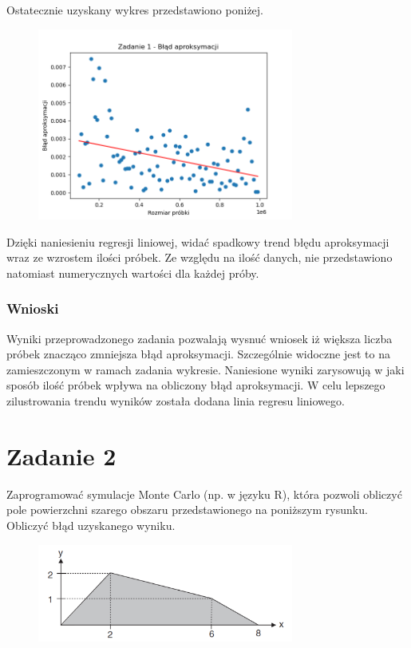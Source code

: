 \documentclass[12pt,oneside,a4paper]{book} %
\theoremstyle{break}
\begin{document}
Ostatecznie uzyskany wykres przedstawiono poniżej.
\begin{figure}[H]
  \centering
  \includegraphics[width=0.75\textwidth]{pi_aproximation_based_on_sample_size.png}
\end{figure}
Dzięki naniesieniu regresji liniowej, widać spadkowy trend błędu aproksymacji wraz ze wzrostem ilości próbek. Ze względu na ilość danych, nie przedstawiono natomiast numerycznych wartości dla każdej próby.

\subsection*{Wnioski}

Wyniki przeprowadzonego zadania pozwalają wysnuć wniosek iż większa liczba próbek znacząco zmniejsza błąd aproksymacji. Szczególnie widoczne jest to na zamieszczonym w ramach zadania wykresie. Naniesione wyniki zarysowują w jaki sposób ilość próbek wpływa na obliczony błąd aproksymacji. W celu lepszego zilustrowania trendu wyników została dodana linia regresu liniowego. 


\chapter*{Zadanie 2}

Zaprogramować symulacje Monte Carlo (np. w języku R), która pozwoli obliczyć pole powierzchni szarego obszaru przedstawionego na poniższym rysunku. Obliczyć błąd uzyskanego wyniku.

\begin{figure}[H]
  \centering
  \includegraphics[width=0.75\textwidth]{figure_from_instruction.png}
\end{figure}
\end{document}
